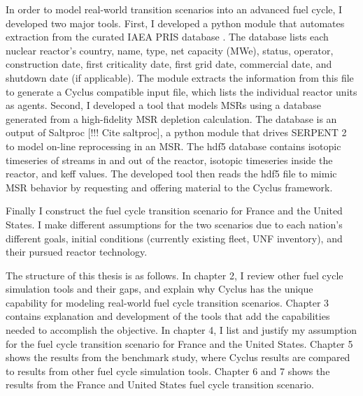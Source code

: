 In order to model real-world transition scenarios into an advanced
fuel cycle, I developed two major tools. First, I developed a python
module that automates extraction from the curated \gls{IAEA} \gls{PRIS} database
\cite{iaea_nuclear_2018}. The database lists each nuclear reactor's
country, name, type, net capacity (\gls{MWe}), status, operator, construction
date, first criticality date, first grid date, commercial date, and shutdown
date (if applicable). The module extracts the information from this file
to generate a Cyclus compatible input file, which lists the individual
reactor units as agents. Second, I developed a tool that models \glspl{MSR}
using a database generated from a high-fidelity \gls{MSR} depletion calculation.
The database is an output of Saltproc [!!! Cite saltproc], a python
module that drives
SERPENT 2 \cite{leppanen_serpentcontinuous-energy_2013} to model on-line reprocessing in an \gls{MSR}.
The hdf5 database contains isotopic timeseries of streams in and out of the reactor,
isotopic timeseries inside the reactor, and keff values. The developed tool then
reads the hdf5 file to mimic \gls{MSR} behavior by requesting and offering
material to the Cyclus framework.

Finally I construct the fuel cycle transition scenario for France and the United States.
I make different assumptions for the two scenarios due to each nation's different goals,
initial conditions (currently existing fleet, \gls{UNF} inventory), and their pursued reactor
technology.

The structure of this thesis is as follows. In chapter 2, I review other fuel cycle simulation
tools and their gaps, and explain why Cyclus
has the unique capability for modeling real-world fuel cycle transition scenarios.
Chapter 3 contains explanation and development of the tools that add the 
capabilities needed to accomplish the objective.
In chapter 4, I list and justify my assumption for the fuel cycle transition
scenario for France and the United States.
Chapter 5 shows the results from the benchmark study, where Cyclus results are compared
to results from other fuel cycle simulation tools.
Chapter 6 and 7 shows the results from the France and United States fuel cycle transition
scenario.

\iffalse
For France, I model the entire \gls{EU} region to calculate \gls{UNF} inventory
in each \gls{EU} nation. This is because France would need to receive \gls{UNF} from other
nations to quickly transition into a \gls{SFR} fleet, since their \gls{UNF} inventory
is small due to their long history of reprocessing for \gls{LWR} \gls{MOX} fuel production.
\fi

